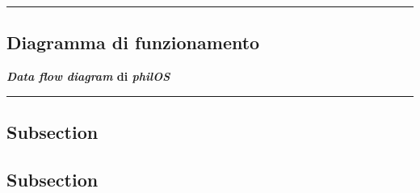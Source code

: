 {\color{gray}\hrule}
\begin{center}
\section{Diagramma di funzionamento}
\textbf{\textit{Data flow diagram} di \textit{philOS}}
\bigskip
\end{center}
{\color{gray}\hrule}

\subsection{Subsection}
\lipsum[1]
\subsection{Subsection}
\lipsum[1-3]

\pagebreak